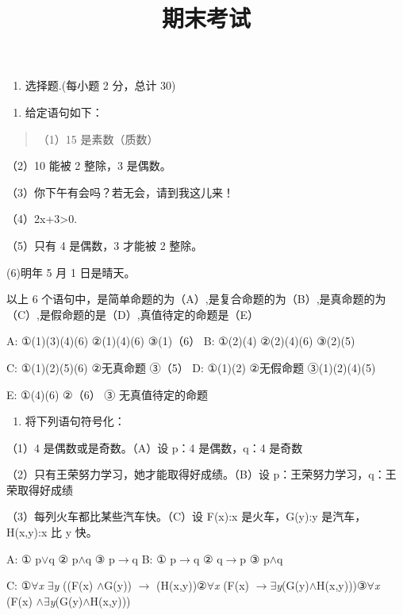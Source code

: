 \documentclass[fontset=exam]{exam-zh}
\title{期末考试}
\begin{document}
\maketitle
{}
\begin{enumerate}
\item
  选择题.(每小题 2 分，总计 30)
\end{enumerate}

\begin{enumerate}
\def\labelenumi{\arabic{enumi}.}
\item
  给定语句如下：
\end{enumerate}

\begin{quote}
（1）15 是素数（质数）
\end{quote}

（2）10 能被 2 整除，3 是偶数。

（3）你下午有会吗？若无会，请到我这儿来！

（4）2x+3\textgreater0.

（5）只有 4 是偶数，3 才能被 2 整除。

(6)明年 5 月 1 日是晴天。

以上 6 个语句中，是简单命题的为（A）,是复合命题的为（B）,是真命题的为（C）,是假命题的是（D）,真值待定的命题是（E）

A: ①(1)(3)(4)(6) ②(1)(4)(6) ③(1)（6） B: ①(2)(4) ②(2)(4)(6) ③(2)(5)

C: ①(1)(2)(5)(6) ②无真命题 ③（5） D: ①(1)(2) ②无假命题 ③(1)(2)(4)(5)

E: ①(4)(6) ②（6） ③ 无真值待定的命题

\begin{enumerate}
\def\labelenumi{\arabic{enumi}.}
\setcounter{enumi}{1}
\item
  将下列语句符号化：
\end{enumerate}

（1）4 是偶数或是奇数。（A）设 p：4 是偶数，q：4 是奇数

（2）只有王荣努力学习，她才能取得好成绩。（B）设 p：王荣努力学习，q：王荣取得好成绩

（3）每列火车都比某些汽车快。（C）设 F(x):x 是火车，G(y):y 是汽车，H(x,y):x 比 y 快。

A: ① p\(\lor\)q ② p\(\land\)q ③ p\(\to\)q B: ① p\(\to\)q ② q\(\to\)p ③ p\(\land\)q

C: ①\(\forall\)\emph{x} \(\exists\)\emph{y} ((F(x) \(\land\)G(y)) \(\to\) (H(x,y))②\(\forall\)\emph{x} (F(x) \(\to\)\(\exists\)\emph{y}(G(y)\(\land\)H(x,y)))③\(\forall\)\emph{x} (F(x) \(\land\)\(\exists\)\emph{y}(G(y)\(\land\)H(x,y)))
\end{document}
